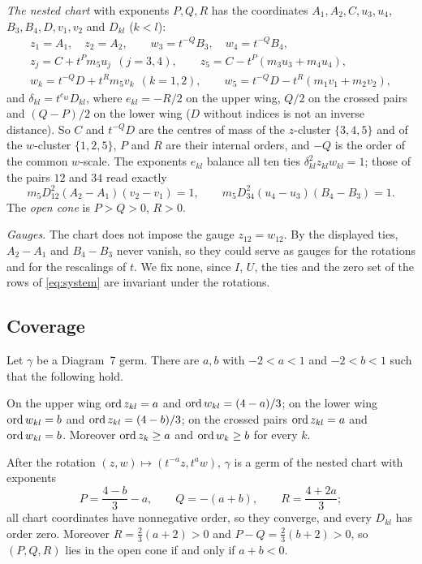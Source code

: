 \emph{The nested chart} with exponents $P,Q,R$ has the coordinates $A_1,A_2,C,u_3,u_4$,
$B_3,B_4,D,v_1,v_2$ and $D_{kl}$ ($k<l$):
\begin{gather*}
  z_1=A_1,\quad z_2=A_2,\qquad w_3=t^{-Q}B_3,\quad w_4=t^{-Q}B_4,\\
  z_j=C+t^Pm_5u_j\ \ (j=3,4),\qquad z_5=C-t^P(m_3u_3+m_4u_4),\\
  w_k=t^{-Q}D+t^Rm_5v_k\ \ (k=1,2),\qquad w_5=t^{-Q}D-t^R(m_1v_1+m_2v_2),
\end{gather*}
and $\delta_{kl}=t^{e_{kl}}D_{kl}$, where $e_{kl}=-R/2$ on the upper wing, $Q/2$ on the crossed
pairs and $(Q-P)/2$ on the lower wing ($D$ without indices is not an inverse distance).
So $C$ and $t^{-Q}D$ are the centres of mass of the $z$-cluster $\{3,4,5\}$ and of the
$w$-cluster $\{1,2,5\}$, $P$ and $R$ are their internal orders, and $-Q$ is the order of the
common $w$-scale.
The exponents $e_{kl}$ balance all ten ties $\delta_{kl}^2z_{kl}w_{kl}=1$; those of the pairs
$12$ and $34$ read exactly
\[
  m_5D_{12}^2(A_2-A_1)(v_2-v_1)=1,\qquad m_5D_{34}^2(u_4-u_3)(B_4-B_3)=1.
\]
The \emph{open cone} is $P>Q>0$, $R>0$.

\emph{Gauges.}  The chart does not impose the gauge $z_{12}=w_{12}$.  By the displayed ties,
$A_2-A_1$ and $B_4-B_3$ never vanish, so they could serve as gauges for the rotations and for
the rescalings of $t$.  We fix none, since $I$, $U$, the ties and the zero set of the rows of
\eqref{eq:system} are invariant under the rotations.

\subsection{Coverage}

\begin{proposition}[Coverage]\label{d7-cover}
Let $\gamma$ be a Diagram~7 germ.  There are $a,b$ with $-2<a<1$ and $-2<b<1$ such that the
following hold.
\begin{romanlist}
  \item On the upper wing $\operatorname{ord} z_{kl}=a$ and $\operatorname{ord} w_{kl}=(4-a)/3$; on the lower wing
  $\operatorname{ord} w_{kl}=b$ and $\operatorname{ord} z_{kl}=(4-b)/3$; on the crossed pairs $\operatorname{ord} z_{kl}=a$ and
  $\operatorname{ord} w_{kl}=b$.  Moreover $\operatorname{ord} z_k\ge a$ and $\operatorname{ord} w_k\ge b$ for every $k$.
  \item After the rotation $(z,w)\mapsto(t^{-a}z,t^{a}w)$, $\gamma$ is a germ of the nested
  chart with exponents
  \[
    P=\frac{4-b}{3}-a,\qquad Q=-(a+b),\qquad R=\frac{4+2a}{3};
  \]
  all chart coordinates have nonnegative order, so they converge, and every $D_{kl}$ has order
  zero.  Moreover $R=\frac23(a+2)>0$ and $P-Q=\frac23(b+2)>0$, so $(P,Q,R)$ lies in the open
  cone if and only if $a+b<0$.
\end{romanlist}
\end{proposition}

